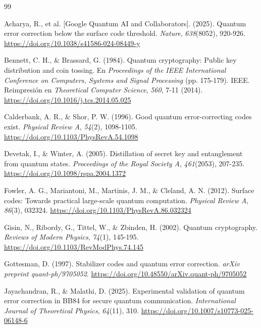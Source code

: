\documentclass[12pt]{report}
\begin{document}
\renewcommand{\bibname}{Referencias}
{}
\begin{thebibliography}{99}

 Acharya, R., et al. [Google Quantum AI and Collaborators]. (2025). Quantum error correction below the surface code threshold. \textit{Nature}, \textit{638}(8052), 920-926. \url{https://doi.org/10.1038/s41586-024-08449-y}

 Bennett, C. H., \& Brassard, G. (1984). Quantum cryptography: Public key distribution and coin tossing. En \textit{Proceedings of the IEEE International Conference on Computers, Systems and Signal Processing} (pp. 175-179). IEEE. Reimpresión en \textit{Theoretical Computer Science}, \textit{560}, 7-11 (2014). \url{https://doi.org/10.1016/j.tcs.2014.05.025}

 Calderbank, A. R., \& Shor, P. W. (1996). Good quantum error-correcting codes exist. \textit{Physical Review A}, \textit{54}(2), 1098-1105. \url{https://doi.org/10.1103/PhysRevA.54.1098}

 Devetak, I., \& Winter, A. (2005). Distillation of secret key and entanglement from quantum states. \textit{Proceedings of the Royal Society A}, \textit{461}(2053), 207-235. \url{https://doi.org/10.1098/rspa.2004.1372}

 Fowler, A. G., Mariantoni, M., Martinis, J. M., \& Cleland, A. N. (2012). Surface codes: Towards practical large-scale quantum computation. \textit{Physical Review A}, \textit{86}(3), 032324. \url{https://doi.org/10.1103/PhysRevA.86.032324}

 Gisin, N., Ribordy, G., Tittel, W., \& Zbinden, H. (2002). Quantum cryptography. \textit{Reviews of Modern Physics}, \textit{74}(1), 145-195. \url{https://doi.org/10.1103/RevModPhys.74.145}

 Gottesman, D. (1997). Stabilizer codes and quantum error correction. \textit{arXiv preprint quant-ph/9705052}. \url{https://doi.org/10.48550/arXiv.quant-ph/9705052}

 Jayachandran, R., \& Malathi, D. (2025). Experimental validation of quantum error correction in BB84 for secure quantum communication. \textit{International Journal of Theoretical Physics}, \textit{64}(11), 310. \url{https://doi.org/10.1007/s10773-025-06148-6}


\end{thebibliography}
\end{document}
